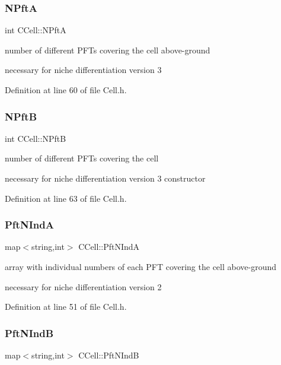 \subsubsection{\texorpdfstring{NPftA}{NPftA}}
{\footnotesize\ttfamily int C\+Cell\+::\+N\+PftA}



number of different P\+F\+Ts covering the cell above-\/ground 

necessary for niche differentiation version 3 

Definition at line 60 of file Cell.\+h.

\mbox{\label{class_c_cell_af6d864155d2f2db766b6a4a37f42d7c1}} 
\subsubsection{\texorpdfstring{NPftB}{NPftB}}
{\footnotesize\ttfamily int C\+Cell\+::\+N\+PftB}



number of different P\+F\+Ts covering the cell 

necessary for niche differentiation version 3 constructor 

Definition at line 63 of file Cell.\+h.

\mbox{\label{class_c_cell_af1774af6aa1b91f512a27782763f4948}} 
\subsubsection{\texorpdfstring{PftNIndA}{PftNIndA}}
{\footnotesize\ttfamily map$<$string,int$>$ C\+Cell\+::\+Pft\+N\+IndA}



array with individual numbers of each P\+FT covering the cell above-\/ground 

necessary for niche differentiation version 2 

Definition at line 51 of file Cell.\+h.

\mbox{\label{class_c_cell_a5be92efe8245f6833c68885913dab5ea}} 
\subsubsection{\texorpdfstring{PftNIndB}{PftNIndB}}
{\footnotesize\ttfamily map$<$string,int$>$ C\+Cell\+::\+Pft\+N\+IndB}



